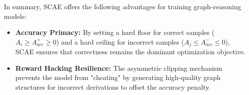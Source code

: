 In summary, SCAE offers the following advantages for training graph-reasoning models:



\begin{itemize}
    \item \textbf{Accuracy Primacy:} By setting a hard floor for correct samples ($A_i \ge A_{acc}^+ \ge 0$) and a hard ceiling for incorrect samples ($A_j \le A_{acc}^- \le 0$), SCAE ensures that correctness remains the dominant optimization objective.
    \item \textbf{Reward Hacking Resilience:} The asymmetric clipping mechanism prevents the model from "cheating" by generating high-quality graph structures for incorrect derivations to offset the accuracy penalty.
\end{itemize}